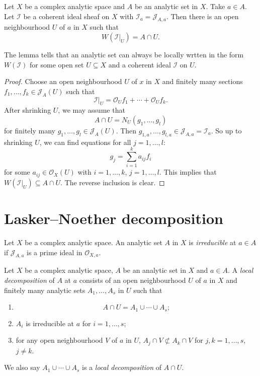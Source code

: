 \begin{lemma}\label{lma-analyticsetlocallyidealsheaf}
    Let $X$ be a complex analytic space and $A$ be an analytic set in $X$. Take $a\in A$.
    Let $\mathcal{I}$ be a coherent ideal sheaf on $X$ with $\mathcal{I}_a=\mathcal{J}_{A,a}$. Then there is an open neighbourhood $U$ of $a$ in $X$ such that
    \[
        W(\mathcal{I}|_U)=A\cap U.  
    \]
\end{lemma}

The lemma tells that an analytic set can always be locally wrtten in the form $W(\mathcal{I})$ for some open set $U\subseteq X$ and a coherent ideal $\mathcal{I}$ on $U$.

\begin{proof}
    Choose an open neighbourhood $U$ of $x$ in $X$ and finitely many sections $f_1,\ldots,f_k\in \mathcal{J}_A(U)$ such that 
    \[
        \mathcal{I}|_U=\mathcal{O}_Uf_1+\cdots+\mathcal{O}_U f_k.  
    \]
    After shrinking $U$, we may assume that 
    \[
        A\cap U=N_U(g_1,\ldots,g_l)  
    \]
    for finitely many $g_1,\ldots,g_l\in \mathcal{J}_A(U)$. Then $g_{1,a},\ldots,g_{l,a}\in \mathcal{J}_{A,a}=\mathcal{I}_a$. So up to shrinking $U$, we can find equations for all $j=1,\ldots,l$:
    \[
        g_j=\sum_{i=1}^k a_{ij}f_i  
    \]
    for some $a_{ij}\in \mathcal{O}_X(U)$ with $i=1,\ldots,k$, $j=1,\ldots,l$. This implies that $W(\mathcal{I}|_U)\subseteq A\cap U$. The reverse inclusion is clear.
\end{proof}



\section{Lasker--Noether decomposition}
\begin{definition}
    Let $X$ be a complex analytic space.
    An analytic set $A$ in $X$ is \emph{irreducible} at $a\in A$ if $\mathcal{J}_{A,a}$ is a prime ideal in $\mathcal{O}_{X,a}$.
\end{definition}

\begin{definition}
    Let $X$ be a complex analytic space, $A$ be an analytic set in $X$ and $a\in A$. A \emph{local decomposition} of $A$ at $a$ consists of an open neighbourhood $U$ of $a$ in $X$ and finitely many analytic sets $A_1,\ldots,A_s$ in $U$ such that
    \begin{enumerate}
        \item 
        \[
            A\cap U=A_1\cup\cdots\cup A_s;  
        \]
        \item $A_i$ is irreducible at $a$ for $i=1,\ldots,s$;
        \item for any open neighbourhood $V$ of $a$ in $U$, $A_j\cap V\not\subset A_k\cap V$ for $j,k=1,\ldots,s$, $j\neq k$.
    \end{enumerate}
    We also say $A_1\cup\cdots \cup A_s$ is a \emph{local decomposition} of $A\cap U$.
\end{definition}

